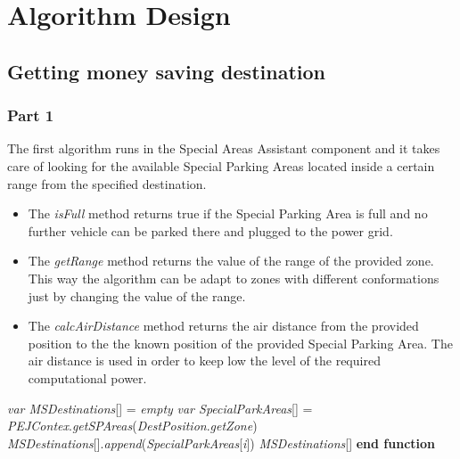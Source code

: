 \section{Algorithm Design}


\subsection{Getting money saving destination}

\subsubsection{Part 1}

The first algorithm runs in the Special Areas Assistant component and it takes care of looking for the available Special Parking Areas located inside a certain range from the specified destination.

\begin{itemize}
    \item The \textit{isFull} method returns true if the Special Parking Area is full and no further vehicle can be parked there and plugged to the power grid.
    \item The \textit{getRange} method returns the value of the range of the provided zone.\newline
    This way the algorithm can be adapt to zones with different conformations just by changing the value of the range.
    \item The \textit{calcAirDistance} method returns the air distance from the provided position to the the known position of the provided Special Parking Area. The air distance is used in order to keep low the level of the required computational power.
\end{itemize}

\begin{algorithm}
\caption{}\label{euclid}
\begin{algorithmic}[1]
\State \textit{var MSDestinations}[] = \textit{empty}
\State \textit{var SpecialParkAreas}[] = \textit{PEJContex}.\textit{getSPAreas}(\textit{DestPosition}.\textit{getZone})
\State \textit{MSDestinations}[].\textit{append}(\textit{SpecialParkAreas}[\textit{i}])
\EndIf
\EndFor
\State \Return \textit{MSDestinations}[]
\EndFunction
\State \textbf{end function}
\end{algorithmic}
\end{algorithm}


